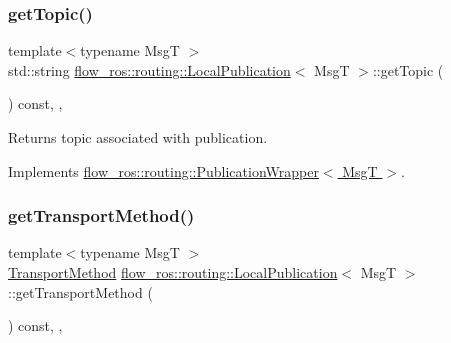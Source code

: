 \subsubsection{\texorpdfstring{get\+Topic()}{getTopic()}}
{\footnotesize\ttfamily template$<$typename MsgT $>$ \\
std\+::string \hyperlink{classflow__ros_1_1routing_1_1_local_publication}{flow\+\_\+ros\+::routing\+::\+Local\+Publication}$<$ MsgT $>$\+::get\+Topic (\begin{DoxyParamCaption}{ }\end{DoxyParamCaption}) const\hspace{0.3cm}{\ttfamily [inline]}, {\ttfamily [override]}, {\ttfamily [virtual]}}



Returns topic associated with publication. 



Implements \hyperlink{classflow__ros_1_1routing_1_1_publication_wrapper_a1aa441bb1846211cb803362233d4ee0b}{flow\+\_\+ros\+::routing\+::\+Publication\+Wrapper$<$ Msg\+T $>$}.

\mbox{\label{classflow__ros_1_1routing_1_1_local_publication_a386554f0af2d80bdf566c496ea01b4b8}} 
\subsubsection{\texorpdfstring{get\+Transport\+Method()}{getTransportMethod()}}
{\footnotesize\ttfamily template$<$typename MsgT $>$ \\
\hyperlink{transport__info_8h_ae57afcf849a5bdb82b958347c6ccc57b}{Transport\+Method} \hyperlink{classflow__ros_1_1routing_1_1_local_publication}{flow\+\_\+ros\+::routing\+::\+Local\+Publication}$<$ MsgT $>$\+::get\+Transport\+Method (\begin{DoxyParamCaption}{ }\end{DoxyParamCaption}) const\hspace{0.3cm}{\ttfamily [inline]}, {\ttfamily [override]}, {\ttfamily [virtual]}}







